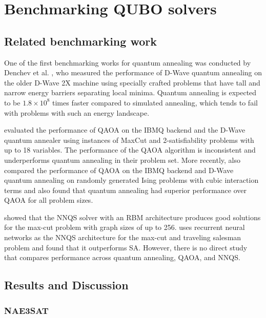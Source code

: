 \chapter{Benchmarking QUBO solvers}\label{benchmark}

\section{Related benchmarking work}
One of the first benchmarking works for quantum annealing was conducted by Denchev et al. , who measured the performance of D-Wave quantum annealing on the older D-Wave 2X machine using specially crafted problems that have tall and narrow energy barriers separating local minima. Quantum annealing is expected to be $1.8 \times 10^8$ times faster compared to simulated annealing, which tends to fail with problems with such an energy landscape.


 evaluated the performance of QAOA on the IBMQ backend and the D-Wave quantum annealer using instances of MaxCut and 2-satisfiability problems with up to 18 variables. The performance of the QAOA algorithm is inconsistent and underperforms quantum annealing in their problem set. More recently,  also compared the performance of QAOA on the IBMQ backend and D-Wave quantum annealing on randomly generated Ising problems with cubic interaction terms and also found that quantum annealing had superior performance over QAOA for all problem sizes. 

 showed that the NNQS solver with an RBM architecture produces good solutions for the max-cut problem with graph sizes of up to 256.  uses recurrent neural networks as the NNQS architecture for the max-cut and traveling salesman problem and found that it outperforms SA. However, there is no direct study that compares performance across quantum annealing, QAOA, and NNQS.

\section{Results and Discussion}
\subsection{NAE3SAT}

